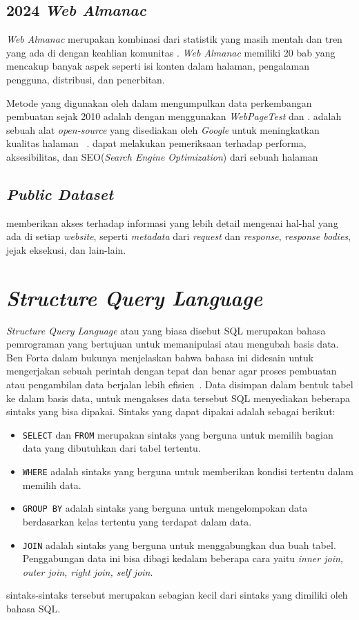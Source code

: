 \subsection{2024 \textit{Web Almanac}}
\label{subsec:almanac}

\textit{Web Almanac} merupakan kombinasi dari statistik yang masih mentah dan tren yang ada di \http dengan keahlian komunitas \web. \textit{Web Almanac} memiliki 20 bab yang mencakup banyak aspek seperti isi konten dalam halaman, pengalaman pengguna, distribusi, dan penerbitan.

Metode yang digunakan oleh \http dalam mengumpulkan data perkembangan pembuatan \web sejak 2010 adalah dengan menggunakan \textit{WebPageTest} dan \light. \light adalah sebuah alat \textit{open-source} yang disediakan oleh \textit{Google} untuk meningkatkan kualitas halaman \web~\cite{lighthouse}. \light dapat melakukan pemeriksaan terhadap performa, aksesibilitas, dan SEO(\textit{Search Engine Optimization}) dari sebuah halaman \web

\subsection{\textit{Public Dataset}}
\label{subsec:pd}
\http memberikan akses terhadap informasi yang lebih detail mengenai hal-hal yang ada di setiap \textit{website}, seperti \textit{metadata} dari \textit{request} dan \textit{response}, \textit{response bodies}, jejak eksekusi, dan lain-lain.


\section{\textit{Structure Query Language}}
\label{sec:sql}
\textit{Structure Query Language} atau yang biasa disebut SQL merupakan bahasa pemrograman yang bertujuan untuk memanipulasi atau mengubah basis data. Ben Forta dalam bukunya menjelaskan bahwa bahasa ini didesain untuk mengerjakan sebuah perintah dengan tepat dan benar agar proses pembuatan atau pengambilan data berjalan lebih efisien~\cite{ben}. Data disimpan dalam bentuk tabel ke dalam basis data, untuk mengakses data tersebut SQL menyediakan beberapa sintaks yang bisa dipakai. Sintaks yang dapat dipakai adalah sebagai berikut:
\begin{itemize}
    \item \verb|SELECT| dan \verb|FROM| merupakan sintaks yang berguna untuk memilih bagian data yang dibutuhkan dari tabel tertentu.
    \item \verb|WHERE| adalah sintaks yang berguna untuk memberikan kondisi tertentu dalam memilih data.
    \item \verb|GROUP BY| adalah sintaks yang berguna untuk mengelompokan data berdasarkan kelas tertentu yang terdapat dalam data.
    \item \verb|JOIN| adalah sintaks yang berguna untuk menggabungkan dua buah tabel. Penggabungan data ini bisa dibagi kedalam beberapa cara yaitu \textit{inner join, outer join, right join, self join}.
\end{itemize}
sintaks-sintaks tersebut merupakan sebagian kecil dari sintaks yang dimiliki oleh bahasa SQL.

